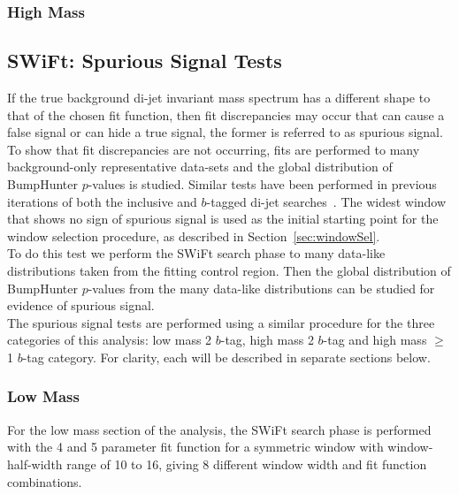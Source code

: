 \subsubsection{High Mass}
\label{sec:highmass_windowSelTests} 

\subsection{SWiFt: Spurious Signal Tests}
\label{sec:spuriousSignal}



If the true background di-jet invariant mass spectrum has a different shape to that of the chosen fit function, then fit discrepancies may occur
that can cause a false signal or can hide a true signal, the former is referred to as spurious signal.
To show that fit discrepancies are not occurring, fits are performed to many background-only representative
data-sets and the global distribution of {\sc BumpHunter} $p$-values is studied.
Similar tests have been performed in previous iterations of both the inclusive and $b$-tagged di-jet searches~\cite{highmass,2015Moriondsupport,2016ICHEPsupport}.
The widest window that shows no sign of spurious signal is used as the initial starting point for the window selection procedure, as described in Section~\ref{sec:windowSel}.\\
 
To do this test we perform the SWiFt search phase to many data-like distributions taken from the fitting control region.
Then the global distribution of {\sc BumpHunter} $p$-values from the many data-like distributions can be studied for evidence of spurious signal.\\

The spurious signal tests are performed using a similar procedure for the three categories of this analysis:
low mass 2 $b$-tag, high mass 2 $b$-tag and high mass $\geq$1 $b$-tag category.
For clarity, each will be described in separate sections below.

\subsubsection{Low Mass}
\label{sec:lowmass_spuriousSignal}

For the low mass section of the analysis,
the SWiFt search phase is performed with the 4 and 5 parameter fit function for a symmetric window with window-half-width range of 10 to 16,
giving 8 different window width and fit function combinations. \\

